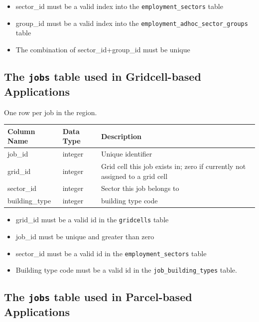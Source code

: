 \begin{itemize} \tight
\item sector_id must be a valid index into the \verb|employment_sectors| table
\item group_id must be a valid index into the \verb|employment_adhoc_sector_groups| table
\item The combination of sector_id+group_id must be unique
\end{itemize}

\subsection{The {\tt jobs} table used in Gridcell-based Applications}

One row per job in the region.

\begin{tabular}{lll}
\textbf{Column Name} & \textbf{Data Type} & \textbf{Description} \\
\hline
job_id & integer & Unique identifier  \\
\hline
grid_id & integer & Grid cell this job exists in; zero if currently not assigned to a grid cell  \\
\hline
sector_id & integer & Sector this job belongs to  \\\hline
building_type & integer & building type code \\
\hline

\end{tabular}

\begin{itemize} \tight
\item grid_id must be a valid id in the \verb|gridcells| table
\item job_id must be unique and greater than zero
\item sector_id must be a valid id in the \verb|employment_sectors| table
\item Building type code must be a valid id in the \verb|job_building_types| table.
\end{itemize}

\subsection{The {\tt jobs} table used in Parcel-based Applications}

